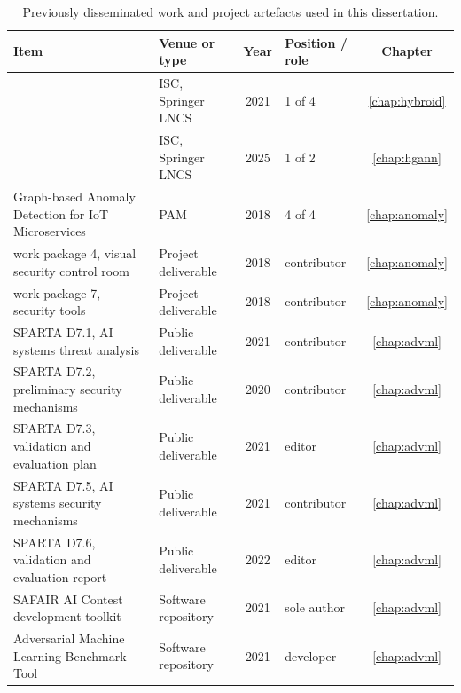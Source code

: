 \begin{table}[htbp]
  \caption{Previously disseminated work and project artefacts used in this dissertation.}
  \label{tab:intro:publications}
  \small
  \begin{tabularx}{\textwidth}{@{}Xlclc@{}}
    \toprule
    Item & Venue or type & Year & Position / role & Chapter \\
    \midrule
    \hybroid{} \cite{norouzian2021hybroid}
      & ISC, Springer LNCS     & 2021 & 1 of 4      & \ref{chap:hybroid} \\
    \hgann{} \cite{norouzian2025hgannmal}
      & ISC, Springer LNCS     & 2025 & 1 of 2      & \ref{chap:hgann} \\
    Graph-based Anomaly Detection for IoT Microservices \cite{aubet2018graph}
      & PAM         & 2018 & 4 of 4      & \ref{chap:anomaly} \\
    \iuno{} work package 4, visual security control room \cite{iuno_ap4}
      & Project deliverable    & 2018 & contributor & \ref{chap:anomaly} \\
    \iuno{} work package 7, security tools \cite{iuno_ap7}
      & Project deliverable    & 2018 & contributor & \ref{chap:anomaly} \\
    SPARTA D7.1, AI systems threat analysis \cite{sparta2021d71}
      & Public deliverable     & 2021 & contributor & \ref{chap:advml} \\
    SPARTA D7.2, preliminary security mechanisms \cite{sparta2020d72}
      & Public deliverable     & 2020 & contributor & \ref{chap:advml} \\
    SPARTA D7.3, validation and evaluation plan \cite{sparta2021d73}
      & Public deliverable     & 2021 & editor      & \ref{chap:advml} \\
    SPARTA D7.5, AI systems security mechanisms \cite{sparta2021d75}
      & Public deliverable     & 2021 & contributor & \ref{chap:advml} \\
    SPARTA D7.6, validation and evaluation report \cite{sparta2022d76}
      & Public deliverable     & 2022 & editor      & \ref{chap:advml} \\
    SAFAIR AI Contest development toolkit \cite{norouzian2021safairtoolkit}
      & Software repository    & 2021 & sole author & \ref{chap:advml} \\
    Adversarial Machine Learning Benchmark Tool \cite{norouzian2021adversarialbenchmark}
      & Software repository    & 2021 & developer   & \ref{chap:advml} \\
    \bottomrule
  \end{tabularx}
\end{table}

